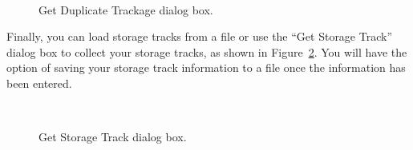 \begin{figure}
\begin{centering}
\\
\caption{Get Duplicate Trackage dialog box.}
\label{fig:getDuplicateTrackageDialog}
\end{centering}
\end{figure}

Finally, you can load storage tracks from a file or use the ``Get
Storage Track'' dialog box to collect your storage tracks, as shown in
Figure~\ref{fig:getStorageTracksDialog}.  You will have the option of
saving your storage track information to a file once the information has
been entered.

\begin{figure}
\begin{centering}
\\
\caption{Get Storage Track dialog box.}
\label{fig:getStorageTracksDialog}
\end{centering}
\end{figure}   

